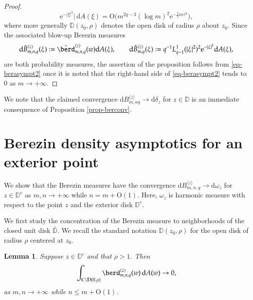 \documentclass{birkart}
\newtheorem{lem}[thm]{Lemma}
\theoremstyle{definition}
\theoremstyle{remark}
\numberwithin{equation}{section}
\numberwithin{figure}{section}
\newcommand{\e}{\mathrm e}
\newcommand{\1}{{\mathbf 1}}
\newcommand{\Rpar}{q}
\newcommand{\C}{{\mathbb C}}
\newcommand{\D}{{\mathbb D}}
\newcommand{\Ordo}{\mathrm{O}}
\newcommand{\diff}{{\mathrm d}}
\begin{document}
\begin{proof}
\begin{equation}
\e^{-|\xi|^2}\big|\,\diff A(\xi)=
\Ordo\big(m^{2\Rpar-3}(\log m)^2\e^{-\frac12 m\tau^2}\big),    
\end{equation}
where more generally $\D(z_0,\rho)$ denotes the open disk of radius $\rho$ 
about $z_0$. Since the associated blow-up Berezin measures
\[
\diff\hat B^{\langle z\rangle}_{m,n,\Rpar}(\xi):=
\hat\berd^{\langle z\rangle}_{m,n,\Rpar}(w)
\diff A(\xi),\qquad \diff\hat B^{\langle z\rangle}_{m,\Rpar}(\xi):=
\Rpar^{-1}L^1_{\Rpar-1}(|\xi|^2)^2\e^{-|\xi|^2}\diff A(\xi),
\]
are both probability measures, the assertion of the proposition follows
from \eqref{eq-berasympt2} once it is noted that the right-hand side of
\eqref{eq-berasympt2} tends to $0$ as $m\to+\infty$. 
\end{proof}

We note that the claimed convergence $\diff B^{\langle z\rangle}_{m,n\Rpar}\to
\diff\delta_z$ for $z\in\D$ is an immediate consequence of Proposition 
\ref{prop-berconv}.

\section{Berezin density asymptotics for an 
exterior point}

We show that the Berezin measures have the convergence
$\diff B^{\langle z\rangle}_{m,n,\Rpar}\to\diff\omega_z$ for $z\in\D^e$ as
$m,n\to+\infty$ while $n=m+\Ordo(1)$. Here, $\omega_z$ is harmonic measure 
with respect to the point $z$ and the exterior disk $\mathbb{D}^e$.
\medskip

We first study the concentration of the Berezin measure to neighborhoods of 
the closed unit disk $\bar\D$. We recall the standard notation $\D(z_0,\rho)$
for the open disk of radius $\rho$ centered at $z_0$. 

\begin{lem} Suppose $z\in\D^e$ and that $\rho>1$. Then 
\begin{equation}
\int_{\C\setminus\D(0,\rho)}\berd^{\langle z\rangle}_{m,n,\Rpar}(w)\,
\diff A(w) \to 0,
\end{equation}
as $m,n\to+\infty$ while $n\leq m+\Ordo(1)$. 
\end{lem}
\end{document}
